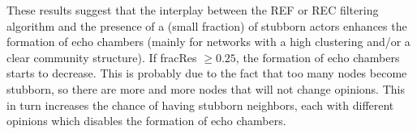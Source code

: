 \documentclass[11 pt , letterpaper , twoside , openright]{book}
\begin{document}
\newline
These results suggest that the interplay between the REF or REC filtering algorithm and the presence of a (small fraction) of stubborn actors enhances the formation of echo chambers (mainly for networks with a high clustering and/or a clear community structure). %
If fracRes $\geqslant 0.25$, the formation of echo chambers starts to decrease. This is probably due to the fact that too many nodes become stubborn, so there are more and more nodes that will not change opinions. This in turn increases the chance of having stubborn neighbors, each with different opinions which disables the formation of echo chambers.\\
\newline
\end{document}
